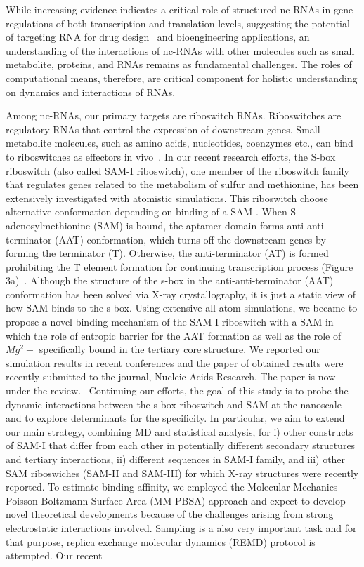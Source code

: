 \documentclass[a4paper,10pt]{article}
\begin{document}

While increasing evidence indicates a critical role of structured nc-RNAs in gene regulations of both transcription and translation levels, suggesting the potential of targeting RNA for drug design~\cite{foloppe} and bioengineering applications, an understanding of the interactions of nc-RNAs with other molecules such as small metabolite, proteins, and RNAs remains as fundamental challenges.  The roles of computational means, therefore, are critical component for holistic understanding on dynamics and interactions of RNAs.

Among nc-RNAs, our primary targets are riboswitch RNAs. Riboswitches are regulatory RNAs that control the expression of downstream genes. Small metabolite molecules, such as amino acids, nucleotides, coenzymes etc., can bind to riboswitches as effectors in vivo~\cite{mandal}.  In our recent research efforts, the S-box riboswitch (also called SAM-I riboswitch), one member of the riboswitch family that regulates genes related to the metabolism of sulfur and methionine, has been extensively investigated with atomistic simulations.  This riboswitch choose alternative conformation depending on binding of a SAM .  When S-adenosylmethionine (SAM) is bound, the aptamer domain forms anti-anti-terminator (AAT) conformation, which turns off the downstream genes by forming the terminator (T). Otherwise, the anti-terminator (AT) is formed prohibiting the T element formation for continuing transcription process (Figure 3a)~\cite{brooke}. Although the structure of the s-box in the anti-anti-terminator (AAT) conformation has been solved via X-ray crystallography, it is just a static view of how SAM binds to the s-box.  Using extensive all-atom simulations, we became to propose a novel binding mechanism of the SAM-I riboswitch with a SAM in which the role of entropic barrier for the AAT formation as well as the role of $Mg^2+$ specifically bound in the tertiary core structure.  We reported our simulation results in recent conferences and the paper of obtained results were recently submitted to the journal, Nucleic Acids Research.  The paper is now under the review.~\cite{SAM-I-NAR2009} Continuing our efforts, the goal of this study is to probe the dynamic interactions between the s-box riboswitch and SAM at the nanoscale and to explore determinants for the specificity. In particular, we aim to extend our main strategy, combining MD and statistical analysis, for i) other constructs of SAM-I that differ from each other in potentially different secondary structures and tertiary interactions, ii) different sequences in SAM-I family, and iii) other SAM riboswiches (SAM-II and SAM-III) for which X-ray structures were recently reported.  To estimate binding affinity, we employed the Molecular Mechanics - Poisson Boltzmann Surface Area (MM-PBSA) approach and expect to develop novel theoretical developments because of the challenges arising from strong electrostatic interactions involved.  Sampling is a also very important task and for that purpose, replica exchange molecular dynamics (REMD) protocol is attempted.  Our recent 
\end{document}
